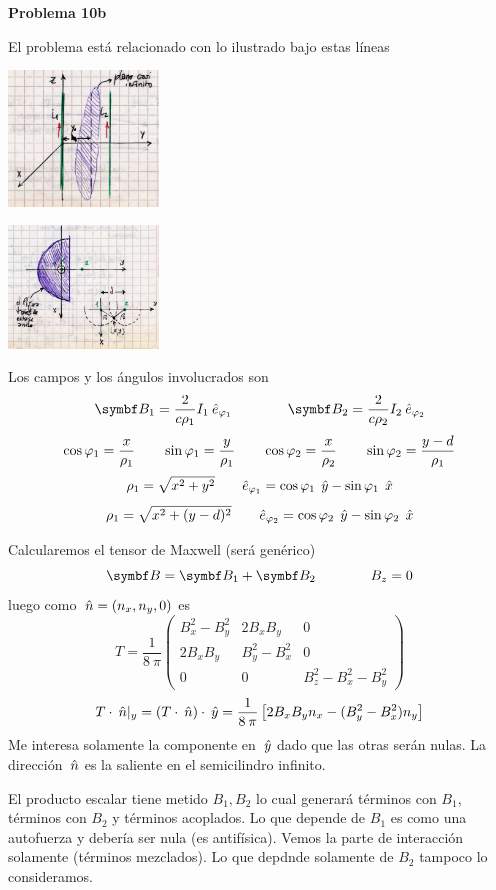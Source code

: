 \documentclass[10pt,oneside]{CBFT_book}
\begin{document}
\begin{ejemplo}{\bf Problema 10b}

El problema está relacionado con lo ilustrado bajo estas líneas

\includegraphics[width=0.3\textwidth]{images/fig_ft1_problema10bA.jpg}

\includegraphics[width=0.3\textwidth]{images/fig_ft1_problema10bB.jpg}

Los campos y los ángulos involucrados son
\[
	\vb{B}_1 = \frac{2}{c \rho_1 } I_1 \: \hat{e}_{\vp_1} \qquad \qquad 
	\vb{B}_2 = \frac{2}{c \rho_2 } I_2 \: \hat{e}_{\vp_2}
\]
\[
	\cos\varphi_1 = \frac{x}{\rho_1} \qquad \sin\varphi_1 = \frac{y}{\rho_1} \qquad 
	\cos\varphi_2 = \frac{x}{\rho_2} \qquad \sin\varphi_2 = \frac{y-d}{\rho_1} 
\]
\[
	\rho_1 = \sqrt{ x^2 + y^2 } \qquad \hat{e}_{\varphi_1} = \cos\varphi_1 \:\:\hat{y} - \sin\varphi_1 \:\:\hat{x}
\]
\[
	\rho_1 = \sqrt{ x^2 + (y-d)^2 } \qquad 
	\hat{e}_{\varphi_2} = \cos\varphi_2 \:\:\hat{y} - \sin\varphi_2 \:\:\hat{x}
\]
 
Calcularemos el tensor de Maxwell (será genérico)
\[
	\vb{B} = \vb{B}_1 + \vb{B}_2 \qquad \qquad B_z=0
\]
luego como $\:\hat{n} = (n_x,n_y,0)$ es
\[
	T = \frac{1}{8\:\pi}\begin{pmatrix}
	        B_x^2 - B_y^2  & 2 B_x B_y & 0 \\
		2 B_x B_y  & B_y^2 - B_x^2  & 0 \\
		0	& 0	& B_z^2 - B_x^2 - B_y^2
	       \end{pmatrix}	
\]
\[
	T \cdot \:\hat{n} |_y = (T\cdot\:\hat{n})\cdot\:\hat{y} =
	\frac{1}{8\:\pi} \left[ 2B_xB_y n_x - ( B_y^2 - B_x^2 ) n_y\right]
\]
Me interesa solamente la componente en $\:\hat{y}$ dado que las otras serán nulas.
La dirección $\:\hat{n}$ es la saliente en el semicilindro infinito.

El producto escalar tiene metido $B_1, B_2$ lo cual generará términos con $B_1$,
términos con $B_2$ y términos acoplados.
Lo que depende de $B_1$ es como una autofuerza y debería ser nula (es antifísica).
Vemos la parte de interacción solamente (términos mezclados).
Lo que depdnde solamente de $B_2$ tampoco lo consideramos.


\end{ejemplo}
\end{document}
